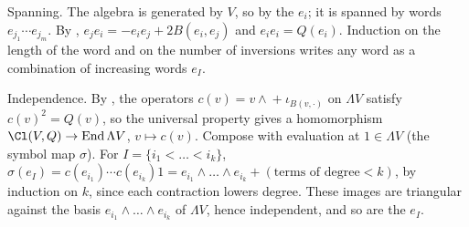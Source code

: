 Spanning. The algebra is generated by $V$, so by the $e_i$; it is spanned by words $e_{j_1} \cdots e_{j_m}$. By , $e_j e_i = -e_i e_j + 2B(e_i, e_j)$ and $e_i e_i = Q(e_i)$. Induction on the length of the word and on the number of inversions writes any word as a combination of increasing words $e_I$.

Independence. By , the operators $c(v) = v \wedge {} + \iota_{B(v, \cdot)}$ on $\Lambda V$ satisfy $c(v)^{2} = Q(v)$, so the universal property gives a homomorphism $\Cl(V, Q) \to \operatorname{End} \Lambda V$, $v \mapsto c(v)$. Compose with evaluation at $1 \in \Lambda V$ (the symbol map $\sigma$). For $I = \{i_1 < \dots < i_k\}$, $\sigma(e_I) = c(e_{i_1}) \cdots c(e_{i_k}) 1 = e_{i_1} \wedge \dots \wedge e_{i_k} + (\text{terms of degree} < k)$, by induction on $k$, since each contraction lowers degree. These images are triangular against the basis $e_{i_1} \wedge \dots \wedge e_{i_k}$ of $\Lambda V$, hence independent, and so are the $e_I$.
